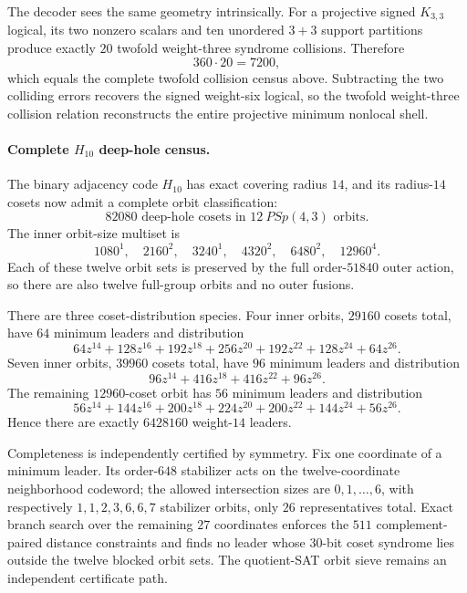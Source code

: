 The decoder sees the same geometry intrinsically.  For a projective signed $K_{3,3}$ logical, its two nonzero scalars and ten unordered $3+3$ support partitions produce exactly $20$ twofold weight-three syndrome collisions.  Therefore
\[
 360\cdot20=7200,
\]
which equals the complete twofold collision census above.  Subtracting the two colliding errors recovers the signed weight-six logical, so the twofold weight-three collision relation reconstructs the entire projective minimum nonlocal shell.

\paragraph{Complete $H_{10}$ deep-hole census.}
The binary adjacency code $H_{10}$ has exact covering radius $14$, and its radius-$14$ cosets now admit a complete orbit classification:
\[
 \boxed{82080\text{ deep-hole cosets in }12\ PSp(4,3)\text{ orbits}.}
\]
The inner orbit-size multiset is
\[
1080^1,\quad2160^2,\quad3240^1,\quad4320^2,\quad6480^2,\quad12960^4.
\]
Each of these twelve orbit sets is preserved by the full order-$51840$ outer action, so there are also twelve full-group orbits and no outer fusions.

There are three coset-distribution species.  Four inner orbits, $29160$ cosets total, have $64$ minimum leaders and distribution
\[
64z^{14}+128z^{16}+192z^{18}+256z^{20}+192z^{22}+128z^{24}+64z^{26}.
\]
Seven inner orbits, $39960$ cosets total, have $96$ minimum leaders and distribution
\[
96z^{14}+416z^{18}+416z^{22}+96z^{26}.
\]
The remaining $12960$-coset orbit has $56$ minimum leaders and distribution
\[
56z^{14}+144z^{16}+200z^{18}+224z^{20}+200z^{22}+144z^{24}+56z^{26}.
\]
Hence there are exactly $6428160$ weight-$14$ leaders.

Completeness is independently certified by symmetry.  Fix one coordinate of a minimum leader.  Its order-$648$ stabilizer acts on the twelve-coordinate neighborhood codeword; the allowed intersection sizes are $0,1,\ldots,6$, with respectively $1,1,2,3,6,6,7$ stabilizer orbits, only $26$ representatives total.  Exact branch search over the remaining $27$ coordinates enforces the $511$ complement-paired distance constraints and finds no leader whose $30$-bit coset syndrome lies outside the twelve blocked orbit sets.  The quotient-SAT orbit sieve remains an independent certificate path.
